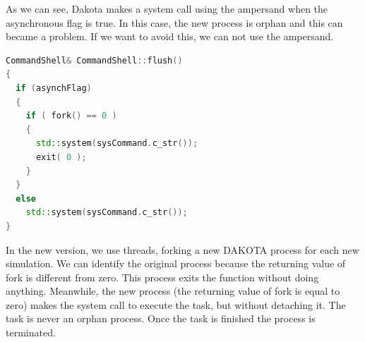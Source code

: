 \documentclass[12pt,a4paper,article]{memoir} %
\begin{document}
As we can see, Dakota makes a system call using the ampersand when the asynchronous flag is true. In this case, the new process is orphan and this can became a problem. If we want to avoid this, we can not use the ampersand.

\begin{lstlisting}[style=MyCodeStyle,language=C++]
CommandShell& CommandShell::flush()
{
  if (asynchFlag)
  {
    if ( fork() == 0 )
    {
      std::system(sysCommand.c_str());
      exit( 0 );
    }
  }
  else
    std::system(sysCommand.c_str());
}
\end{lstlisting}

In the new version, we use threads, forking a new DAKOTA process for each new simulation. We can identify the original process because the returning value of fork is different from zero. This process exits the function without doing anything. Meanwhile, the new process (the returning value of fork is equal to zero) makes the system call to execute the task, but without detaching it. The task is never an orphan process. Once the task is finished the process is terminated.

\end{document}
